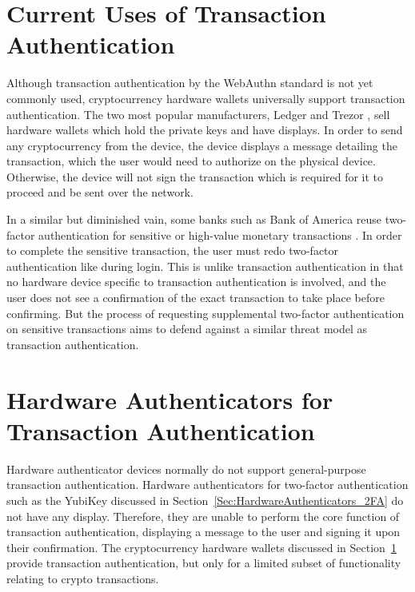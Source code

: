 \section{Current Uses of Transaction Authentication}\label{Sec:CurrentUses_txAuthn}

Although transaction authentication by the WebAuthn standard is not yet commonly used, cryptocurrency hardware wallets universally support transaction authentication. The two most popular manufacturers, Ledger \cite{ledger} and Trezor \cite{trezor}, sell hardware wallets which hold the private keys and have displays. In order to send any cryptocurrency from the device, the device displays a message detailing the transaction, which the user would need to authorize on the physical device. Otherwise, the device will not sign the transaction which is required for it to proceed and be sent over the network.

In a similar but diminished vain, some banks such as Bank of America reuse two-factor authentication for sensitive or high-value monetary transactions \cite{BoA-2FA}. In order to complete the sensitive transaction, the user must redo two-factor authentication like during login. This is unlike transaction authentication in that no hardware device specific to transaction authentication is involved, and the user does not see a confirmation of the exact transaction to take place before confirming. But the process of requesting supplemental two-factor authentication on sensitive transactions aims to defend against a similar threat model as transaction authentication.

\section{Hardware Authenticators for \newline Transaction Authentication}

Hardware authenticator devices normally do not support general-purpose transaction authentication. Hardware authenticators for two-factor authentication such as the YubiKey discussed in Section~\ref{Sec:HardwareAuthenticators_2FA} do not have any display. Therefore, they are unable to perform the core function of transaction authentication, displaying a message to the user and signing it upon their confirmation. The cryptocurrency hardware wallets discussed in Section~\ref{Sec:CurrentUses_txAuthn} provide transaction authentication, but only for a limited subset of functionality relating to crypto transactions.  

